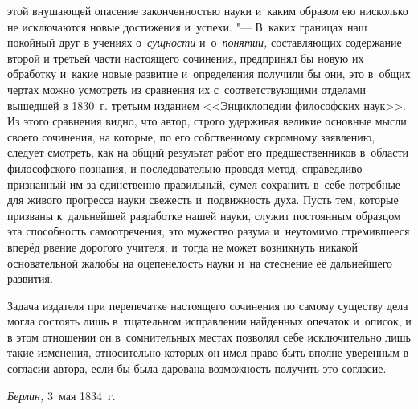этой внушающей опасение законченностью науки и~каким образом ею нисколько не
исключаются новые достижения и~успехи. "--- В~каких границах наш покойный друг
в учениях о~{\em сущности} и~о~{\em понятии,} составляющих содержание второй и
третьей части настоящего сочинения, предпринял бы новую их обработку и~какие
новые развитие и~определения получили бы они, это в~общих чертах можно
усмотреть из сравнения их с~соответствующими отделами вышедшей в 1830~г.
третьим изданием <<Энциклопедии философских наук>>. Из этого сравнения видно,
что автор, строго удерживая великие основные мысли своего сочинения, на
которые, по его собственному скромному заявлению, следует смотреть, как на
общий результат работ его предшественников в~области философского познания, и
последовательно проводя метод, справедливо признанный им за единственно
правильный, сумел сохранить в~себе потребные для живого прогресса науки
свежесть и~подвижность духа. Пусть тем, которые призваны к~дальнейшей
разработке нашей науки, служит постоянным образцом эта способность
самоотречения, это мужество разума и~неутомимо стремившееся вперёд рвение
дорогого учителя; и~тогда не может возникнуть никакой основательной жалобы на
оцепенелость науки и~на стеснение её дальнейшего развития.

Задача издателя при перепечатке настоящего сочинения по самому существу дела
могла состоять лишь в~тщательном исправлении найденных опечаток и~описок, и
в этом отношении он в~сомнительных местах позволял себе исключительно лишь
такие изменения, относительно которых он имел право быть вполне уверенным в
согласии автора, если бы была дарована возможность получить это согласие.

{\em Берлин,} 3~мая 1834~г.
